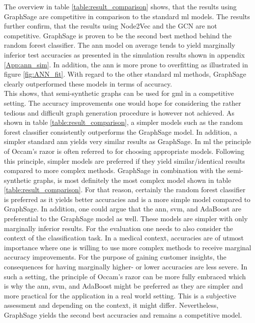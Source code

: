   The overview in table \ref{table:result_comparison} shows, that the results using 
  GraphSage are competitive in comparison to the standard \acs{ml} models. The 
  results further confirm, that the results using Node2Vec and the GCN are not 
  competitive. GraphSage is proven to be the second best method behind the 
  random forest classifier. The \acs{ann} model on average tends to yield 
  marginally inferior test accuracies as presented in the simulation results 
  shown in appendix \ref{App:ann_sim}. In addition, the \acs{ann} is more prone to 
  overfitting as illustrated in figure \ref{fig:ANN_fit}. With regard to the other 
  standard \acs{ml} methods, GraphSage clearly outperformed these models in
  terms of accuracy. \\

  \noindent This shows, that semi-synthetic graphs can be used for \acs{gml} in 
  a competitive setting. The accuracy improvements one would hope for 
  considering the rather tedious and difficult graph generation procedure is 
  however not achieved. As shown in table \ref{table:result_comparison}, a 
  simpler models such as the random forest classifier consistently outperforms 
  the GraphSage model. In addition, a simpler standard \acs{ann} yields very 
  similar results as GraphSage. In \acs{ml} the principle of Occam's razor is 
  often referred to for choosing appropriate models. Following this principle, 
  simpler models are preferred if they yield similar/identical results compared 
  to more complex methods. GraphSage in combination with the semi-synthetic 
  graphs, is most definitely the most complex model shown in table \ref{table:result_comparison}. 
  For that reason, certainly the random forest classifier is preferred as it 
  yields better accuracies and is a more simple model compared to GraphSage. In 
  addition, one could argue that the \acs{ann}, \acs{svm}, and AdaBoost are 
  preferential to the GraphSage model as well. These models are simpler with 
  only marginally inferior results. For the evaluation one needs to also consider 
  the context of the classification task. In a medical context, accuracies are 
  of utmost importance where one is willing to use more complex methods to 
  receive marginal accuracy improvements. For the purpose of gaining customer 
  insights, the consequences for having marginally higher- or lower accuracies 
  are less severe. In such a setting, the principle of Occam's razor can be more 
  fully embraced which is why the \acs{ann}, \acs{svm}, and AdaBoost might be 
  preferred as they are simpler and more practical for the application in a 
  real world setting. This is a subjective assessment and depending on the 
  context, it might differ. Nevertheless, GraphSage yields the second best 
  accuracies and remains a competitive model. \\ 

